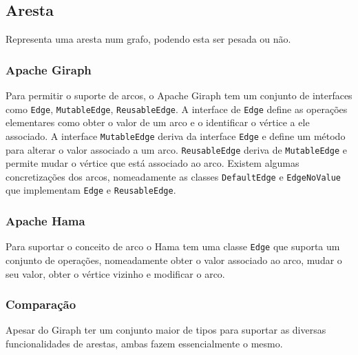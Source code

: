 \newpage
\subsection{Aresta}
Representa uma aresta num grafo, podendo esta ser pesada ou não.

\subsubsection*{Apache Giraph}
Para permitir o suporte de arcos, o Apache Giraph tem um conjunto de interfaces como \texttt{Edge}, \texttt{MutableEdge}, \texttt{ReusableEdge}. A interface de \texttt{Edge} define as operações
elementares como obter o valor de um arco e o identificar o vértice a ele associado. A interface \texttt{MutableEdge} deriva da interface \texttt{Edge} e define
um método para alterar o valor associado a um arco. \texttt{ReusableEdge} deriva de \texttt{MutableEdge} e permite mudar o vértice que está associado ao arco.
Existem algumas concretizações dos arcos, nomeadamente as classes \texttt{DefaultEdge} e \texttt{EdgeNoValue} que implementam \texttt{Edge} e \texttt{ReusableEdge}.

\subsubsection*{Apache Hama}
Para suportar o conceito de arco o Hama tem uma classe \texttt{Edge} que suporta um conjunto de operações, nomeadamente obter o valor associado ao arco, mudar o seu valor,
obter o vértice vizinho e modificar o arco. 

\subsubsection*{Comparação}
Apesar do Giraph ter um conjunto maior de tipos para suportar as diversas funcionalidades de arestas, ambas fazem essencialmente
o mesmo.